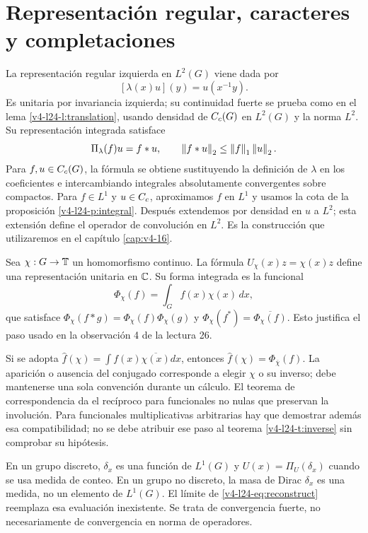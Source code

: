 \section{Representación regular, caracteres y completaciones}
\begin{ejemplo}\label{v4-l24-e:regular}
La representación regular izquierda en $L^2(G)$ viene dada por
\[
[\lambda(x)u](y)=u(x^{-1}y).
\]
Es unitaria por invariancia izquierda; su continuidad fuerte se prueba como en el lema \ref{v4-l24-l:translation}, usando densidad de $C_c(G)$ en $L^2(G)$ y la norma $L^2$. Su representación integrada satisface
\[
\Pi_\lambda(f)u=f*u,\qquad
\left\lVert f*u\right\rVert_2\leq\left\lVert f\right\rVert_1\left\lVert u\right\rVert_2.
\]
Para $f,u\in C_c(G)$, la fórmula se obtiene sustituyendo la definición de $\lambda$ en los coeficientes e intercambiando integrales absolutamente convergentes sobre compactos. Para $f\in L^1$ y $u\in C_c$, aproximamos $f$ en $L^1$ y usamos la cota de la proposición \ref{v4-l24-p:integral}. Después extendemos por densidad en $u$ a $L^2$; esta extensión define el operador de convolución en $L^2$. Es la construcción que utilizaremos en el capítulo \ref{cap:v4-16}.
\end{ejemplo}

\begin{ejemplo}\label{v4-l24-e:characters}
Sea $\chi:G\to\mathbb T$ un homomorfismo continuo. La fórmula $U_\chi(x)z=\chi(x)z$ define una representación unitaria en $\mathbb C$. Su forma integrada es la funcional
\[
\Phi_\chi(f)=\int_G f(x)\chi(x)\,dx,
\]
que satisface $\Phi_\chi(f*g)=\Phi_\chi(f)\Phi_\chi(g)$ y $\Phi_\chi(f^*)=\overline{\Phi_\chi(f)}$. Esto justifica el paso usado en la observación 4 de la lectura 26.

Si se adopta $\widehat f(\chi)=\int f(x)\overline{\chi(x)}dx$, entonces $\widehat f(\chi)=\Phi_{\overline\chi}(f)$. La aparición o ausencia del conjugado corresponde a elegir $\chi$ o su inverso; debe mantenerse una sola convención durante un cálculo. El teorema de correspondencia da el recíproco para funcionales no nulas que preservan la involución. Para funcionales multiplicativas arbitrarias hay que demostrar además esa compatibilidad; no se debe atribuir ese paso al teorema \ref{v4-l24-t:inverse} sin comprobar su hipótesis.
\end{ejemplo}

\begin{observacion}
En un grupo discreto, $\delta_x$ es una función de $L^1(G)$ y $U(x)=\Pi_U(\delta_x)$ cuando se usa medida de conteo. En un grupo no discreto, la masa de Dirac $\delta_x$ es una medida, no un elemento de $L^1(G)$. El límite de \eqref{v4-l24-eq:reconstruct} reemplaza esa evaluación inexistente. Se trata de convergencia fuerte, no necesariamente de convergencia en norma de operadores.
\end{observacion}


